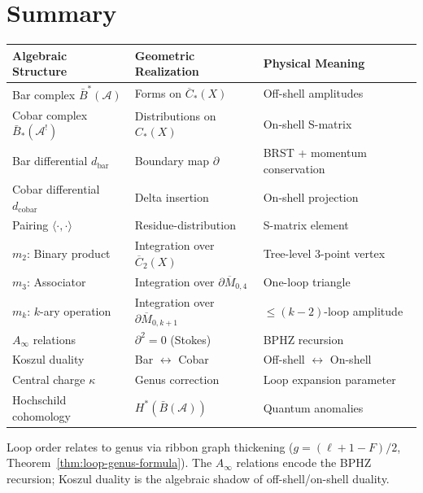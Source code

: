 \section{Summary}
\label{sec:summary-feynman-unity}

\begin{center}
\begin{tabular}{|p{3.8cm}|p{4.8cm}|p{4.8cm}|}
\hline
\textbf{Algebraic Structure} & \textbf{Geometric Realization} & \textbf{Physical Meaning} \\
\hline
\hline
Bar complex $\bar{B}^*(\mathcal{A})$ & Forms on $\overline{C}_*(X)$ & Off-shell amplitudes \\
\hline
Cobar complex $\bar{B}_*(\mathcal{A}^!)$ & Distributions on $C_*(X)$ & On-shell S-matrix \\
\hline
Bar differential $d_{\text{bar}}$ & Boundary map $\partial$ & BRST + momentum conservation \\
\hline
Cobar differential $d_{\text{cobar}}$ & Delta insertion & On-shell projection \\
\hline
Pairing $\langle \cdot, \cdot \rangle$ & Residue-distribution & S-matrix element \\
\hline
\hline
$m_2$: Binary product & Integration over $\overline{C}_2(X)$ & Tree-level 3-point vertex \\
\hline
$m_3$: Associator & Integration over $\partial\overline{M}_{0,4}$ & One-loop triangle \\
\hline
$m_k$: $k$-ary operation & Integration over $\partial\overline{M}_{0,k+1}$ & $\leq(k-2)$-loop amplitude \\
\hline
\hline
$A_\infty$ relations & $\partial^2 = 0$ (Stokes) & BPHZ recursion \\
\hline
Koszul duality & Bar $\leftrightarrow$ Cobar & Off-shell $\leftrightarrow$ On-shell \\
\hline
Central charge $\kappa$ & Genus correction & Loop expansion parameter \\
\hline
Hochschild cohomology & $H^*(\bar{B}(\mathcal{A}))$ & Quantum anomalies \\
\hline
\end{tabular}
\end{center}

Loop order relates to genus via ribbon graph thickening ($g = (\ell + 1 - F)/2$, Theorem~\ref{thm:loop-genus-formula}).  The $A_\infty$ relations encode the BPHZ recursion; Koszul duality is the algebraic shadow of off-shell/on-shell duality.
